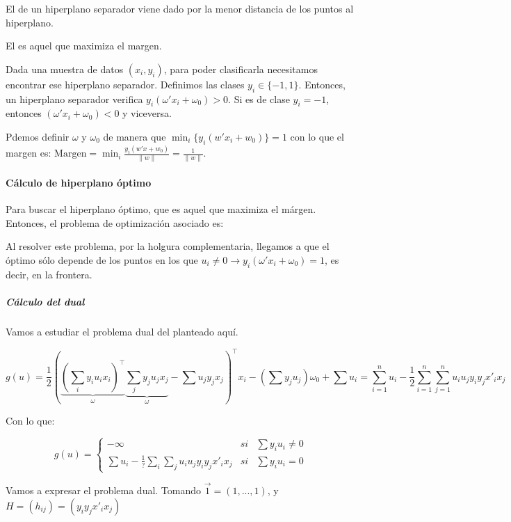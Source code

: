 El  de un hiperplano separador viene dado por la menor distancia de los puntos al hiperplano. 

El  es aquel que maximiza el margen.


Dada una muestra de datos $(x_i,y_i)$, para poder clasificarla necesitamos encontrar ese hiperplano separador.
%
Definimos las clases $y_i\in\{-1,1\}$. Entonces, un hiperplano separador verifica $y_i(ω'x_i+ω_0)>0$.
%
Si es de clase $y_i=-1$, entonces $(ω'x_i + ω_0) < 0$ y viceversa.

Pdemos definir $ω$ y $ω_0$ de manera que  $\min_i \{y_i(w' x_i + w_0)\}=1$
con lo que el margen es: $\mbox{Margen} = \min_i  \frac{y_i(w' x + w_0)}{\|w\|} = \frac{1}{\|w\|}$.


\paragraph{Cálculo de hiperplano óptimo}


Para buscar el hiperplano óptimo, que es aquel que maximiza el márgen. Entonces, el problema de optimización asociado es:

\begin{ioprob}
\end{ioprob}


Al resolver este problema, por la holgura complementaria, llegamos  a que el óptimo sólo depende de los puntos en los que $u_i≠0 \to y_i(ω'x_i + ω_0) = 1$, es decir, en la frontera.

\subparagraph{Cálculo del dual}
Vamos a estudiar el problema dual del planteado aquí.

\[
	g(u) = \frac{1}{2}\left(\underbrace{\left(\sum_i y_iu_ix_i\right)^\top}_{ω} \underbrace{\sum_jy_ju_jx_j}_{ω} - \sum u_jy_jx_j\right)^\top x_i - \left(\sum y_ju_j\right)ω_0 + \sum u_i = \sum_{i=1}^n u_i - \frac{1}{2} \sum_{i=1}^n \sum_{j=1}^n  u_i u_j y_i y_j x'_i x_j 
\]

Con lo que:

\[
	g(u) =\left\{\begin{array}{ccc} -∞ & si &\sum y_iu_i ≠ 0\\ \sum u_i - \frac{1}{?}\sum_i\sum_j u_i u_j y_i y_j x'_i x_j  & si & \sum y_iu_i = 0
	\end{array}\right.
\]

Vamos a expresar el problema dual.
%
Tomando $\vec{1} = (1,...,1)$, y $H = (h_{ij}) = (y_iy_jx'_ix_j)$

